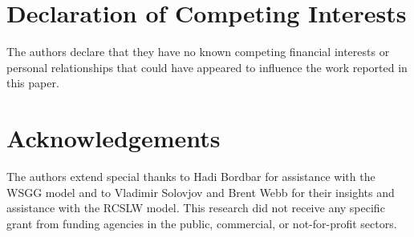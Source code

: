 \documentclass[preprint,12pt]{elsarticle}
\begin{document}

\section{Declaration of Competing Interests} \label{s:coi}

The authors declare that they have no known competing financial interests or personal relationships that could have appeared to influence the work reported in this paper.



\section*{Acknowledgements} \label{sec:acknowledgements}

The authors extend special thanks to Hadi Bordbar for assistance with the WSGG model and to Vladimir Solovjov and Brent Webb for their insights and assistance with the RCSLW model. 
This research did not receive any specific grant from funding agencies in the public, commercial, or
not-for-profit sectors.


 
 
\end{document}
